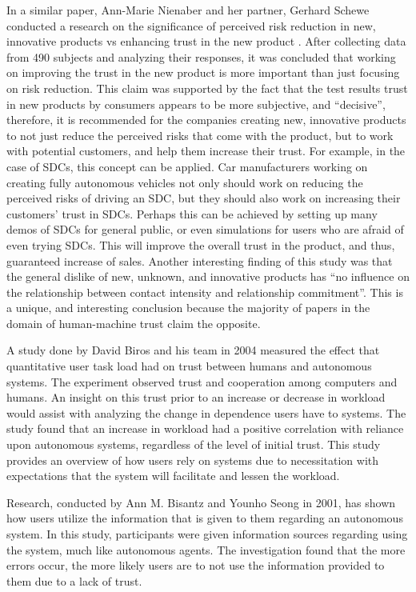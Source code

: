 \documentclass[runningheads,a4paper]{llncs}
\begin{document}
In a similar paper, Ann-Marie Nienaber and her partner, Gerhard Schewe conducted a research on the significance of perceived risk reduction in new, innovative products vs enhancing trust in the new product \cite{nienaber2014enhancing}. After collecting data from 490 subjects and analyzing their responses, it was concluded that working on improving the trust in the new product is more important than just focusing on risk reduction. This claim was supported by the fact that the test results trust in new products by consumers appears to be more subjective, and ``decisive'', therefore, it is recommended for the companies creating new, innovative products to not just reduce the perceived risks that come with the product, but to work with potential customers, and help them increase their trust. For example, in the case of SDCs, this concept can be applied. Car manufacturers working on creating fully autonomous vehicles not only should work on reducing the perceived risks of driving an SDC, but they should also work on increasing their customers' trust in SDCs. Perhaps this can be achieved by setting up many demos of SDCs for general public, or even simulations for users who are afraid of even trying SDCs. This will improve the overall trust in the product, and thus, guaranteed increase of sales. Another interesting finding of this study was that the general dislike of new, unknown, and innovative products has ``no influence on the
relationship between contact intensity and relationship commitment''. This is a unique, and interesting conclusion because the majority of papers in the domain of human-machine trust claim the opposite.

A study done by David Biros and his team in 2004 measured the effect that quantitative user task load had on trust between humans and autonomous systems\cite{biros2004influence}.  The experiment observed trust and cooperation among computers and humans.  An insight on this trust prior to an increase or decrease in workload would assist with analyzing the change in dependence users have to systems.  The study found that an increase in workload had a positive correlation with reliance upon autonomous systems, regardless of the level of initial trust.  This study provides an overview of how users rely on systems due to necessitation with expectations that the system will facilitate and lessen the workload.

Research, conducted by Ann M.  Bisantz and Younho Seong in 2001, has shown how users utilize the information that is given to them regarding an autonomous system\cite{bisantz2001assessment}.  In this study, participants were given information sources regarding using the system, much like autonomous agents.  The investigation found that the more errors occur, the more likely users are to not use the information provided to them due to a lack of trust.  
\end{document}
